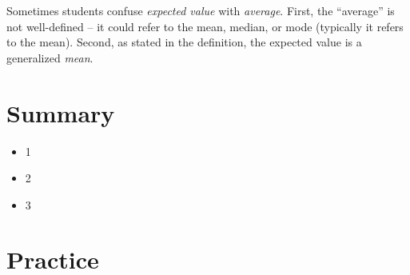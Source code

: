 \documentclass[main.tex]{subfiles}
\begin{document}
Sometimes students confuse \textit{expected value} with \textit{average}. First, the ``average'' is not well-defined -- it could refer to the mean, median, or mode (typically it refers to the mean). Second, as stated in the definition, the expected value is a generalized \textit{mean}.

\begin{defn}
	
\end{defn}

\begin{defn}
	
\end{defn}



\section{Summary}

\begin{itemize}
	\item 1
	\item 2
	\item 3
\end{itemize}

\section{Practice}
\end{document}
